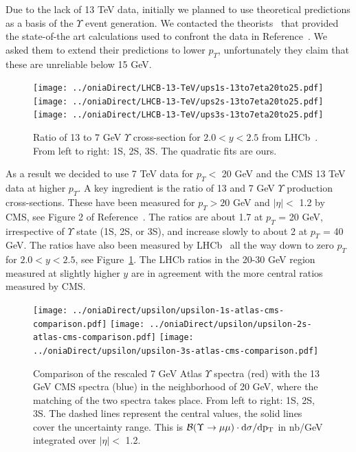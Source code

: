 \documentclass[12pt]{article}
\begin{document}
  Due to the lack of 13 TeV data, initially we planned to use theoretical predictions
  as a basis of the $\Upsilon$ event generation.
  We contacted the theorists~\cite{Han:2014kxa}
  that provided the state-of-the art calculations used to
  confront the data in Reference~\cite{Sirunyan:2017qdw}.  We
  asked them to extend their predictions to lower $p_T$, unfortunately they claim that these
  are unreliable below 15 GeV.

\begin{figure}
\begin{adjustwidth}{-2cm}{-2cm}
\centering
\texttt{[image: ../oniaDirect/LHCB-13-TeV/ups1s-13to7eta20to25.pdf]}
\texttt{[image: ../oniaDirect/LHCB-13-TeV/ups2s-13to7eta20to25.pdf]}
\texttt{[image: ../oniaDirect/LHCB-13-TeV/ups3s-13to7eta20to25.pdf]}
\end{adjustwidth}
\caption{\protect Ratio of 13 to 7 GeV $\Upsilon$ cross-section for $2.0 < y < 2.5$
  from LHCb~\cite{Aaij:2018pfp}.  From left to right: 1S, 2S, 3S. 
  The quadratic fits are ours.}
\label{fig:upsratio}
\end{figure}


  
  As a result we decided to use 7 TeV data for $p_T <$ 20 GeV and the CMS
  13 TeV data at higher $p_T$.  A key ingredient is the ratio of 13 and 7
  GeV $\Upsilon$ production cross-sections.  These have been measured
  for $p_T > 20$ GeV and $|\eta| <$ 1.2 by CMS,
  see Figure 2 of Reference~\cite{Sirunyan:2017qdw}. The ratios
  are about 1.7 at $p_T$ = 20 GeV, irrespective of $\Upsilon$ state
  (1S, 2S, or 3S), and increase slowly to about 2
  at $p_T$ = 40 GeV.  The ratios have also been measured by
  LHCb~\cite{Aaij:2018pfp}
  all the way down to zero $p_T$ for $2.0 < y < 2.5$, see Figure~\ref{fig:upsratio}.
  The LHCb ratios in the 20-30 GeV region measured at slightly higher
  $y$ are in agreement with the more central
  ratios measured by CMS.

\begin{figure}
\begin{adjustwidth}{-2cm}{-2cm}
\centering
\texttt{[image: ../oniaDirect/upsilon/upsilon-1s-atlas-cms-comparison.pdf]}
\texttt{[image: ../oniaDirect/upsilon/upsilon-2s-atlas-cms-comparison.pdf]}
\texttt{[image: ../oniaDirect/upsilon/upsilon-3s-atlas-cms-comparison.pdf]}
\end{adjustwidth}
\caption{\protect Comparison of the rescaled 7 GeV Atlas $\Upsilon$ spectra (red) with the
  13 GeV CMS spectra (blue) in the neighborhood of 20 GeV, where the matching of
  the two spectra takes place.  From left to right: 1S, 2S, 3S.
  The dashed lines represent the central values, the solid
  lines cover the uncertainty range.  This is ${\cal B}(\Upsilon \to \mu\mu) \cdot
  \rm{d}\sigma/\rm{d}p_T$ in nb/GeV integrated
  over $|\eta| <$ 1.2.}
\label{fig:checkMatch}
\end{figure}
\end{document}
